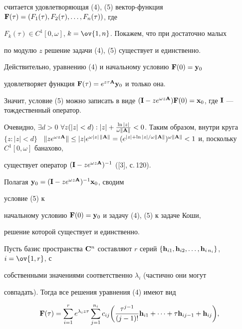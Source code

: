 считается удовлетворяющая (4), (5) вектор-функция $\bold 


F(\tau)=(F_1(\tau),F_2(\tau),\dotsc,F_n(\tau))$, где 


$F_k(\tau)\in C^1[0,\omega]$, $k=\ov{1,n}$. Покажем, что при достаточно малых 


по модулю $z$ решение задачи (4), (5) существует и единственно. 


Действительно, уравнению (4) и начальному условию $\bold F(0)=\bold y_0$ 


удовлетворяет функция $\bold F(\tau)=e^{z\tau\bold A}\bold y_0$ и только она. 


Значит, условие (5) можно записать в виде $(\bold I-z e^{\omega z\bold 


A})\bold F(0)=\bold x_0$, где $\bold I$ --- тождественный оператор. 


Очевидно, $\exists d>0$ $\forall z(|z|<d):|z|+ \frac{\ln|z|}{\omega\|\bold 


A\|}<0$. Таким образом, внутри круга $\{z:|z|<d\}$ \ $\|z e^{\omega z\bold 


A}\|\le |z|e^{\omega|z|\,\|\bold A\|}=(e^{|z|+\ln|z|/\omega\|\bold 


A\|})^{\omega\|\bold A\|}<1$ и, поскольку $C^1[0,\omega]$ банахово, 


существует оператор $(\bold I-z e^{\omega z\bold A})^{-1}$ ([3], с.\,120). 


Полагая $\bold y_0=(\bold I-z e^{\omega z\bold A})^{-1}\bold x_0$, сводим 


условие (5) к 


начальному условию $\bold F(0)=\bold y_0$ и задачу (4), (5) к задаче Коши, 


решение которой существует и единственно. 


 


Пусть базис пространства $\bold C^n$ составляют $r$ серий $\{\bold 


h_{i1},\bold h_{i2},\dotsc,\bold h_{i\, n_i}\}$, $i=\ov{1,r}$, с 


собственными значениями соответственно $\lambda_i$ (частично они могут 


совпадать). Тогда все решения уравнения (4) имеют вид 


\begin{equation} 


\bold F(\tau)=\sum^r_{i=1}e^{\lambda_i z\tau}\sum^{n_i}_{j=1}c_{ij} 


\bigg(\frac{\tau^{j-1}}{(j-1)!}\bold h_{i1}+\dotsb+\tau\bold h_{i j-1}+ 


\bold h_{ij}\bigg),


\end{equation} 


